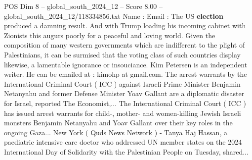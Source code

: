\begin{textsample}{POS Dim 8 – global\_south\_2024\_12 – Score 8.00 – global\_south\_2024\_12/118334856.txt}
Name : Email : The US \textbf{election} produced a damning result.
And with Trump loading his incoming cabinet with Zionists this augurs poorly for a peaceful and loving world.
Given the composition of many western governments which are indifferent to the plight of Palestinians, it can be surmised that the voting class of such countries display likewise, a lamentable ignorance or insouciance.
Kim Petersen is an independent writer.
He can be emailed at : kimohp at gmail.com.
The arrest warrants by the International Criminal Court ( ICC ) against Israeli Prime Minister Benjamin Netanyahu and former Defense Minister Yoav Gallant are a diplomatic disaster for Israel, reported The Economist,...
The International Criminal Court ( ICC ) has issued arrest warrants for child-, mother- and women-killing Jewish Israeli monsters Benjamin Netanyahu and Yoav Gallant over their key roles in the ongoing Gaza...
New York ( Quds News Network ) - Tanya Haj Hassan, a paediatric intensive care doctor who addressed UN member states on the 2024 International Day of Solidarity with the Palestinian People on Tuesday, shared...

\end{textsample}
